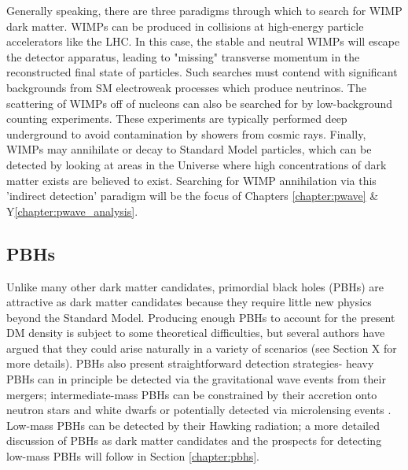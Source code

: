 Generally speaking, there are three paradigms through which to search for WIMP dark matter.
WIMPs can be produced in collisions at high-energy particle accelerators like the LHC.
In this case, the stable and neutral WIMPs will escape the detector apparatus, leading to "missing" transverse momentum in the reconstructed final state of particles.
Such searches must contend with significant backgrounds from SM electroweak processes which produce neutrinos.
The scattering of WIMPs off of nucleons can also be searched for by low-background counting experiments.
These experiments are typically performed deep underground to avoid contamination by showers from cosmic rays.
Finally, WIMPs may annihilate or decay to Standard Model particles, which can be detected by looking at areas in the Universe where high concentrations of dark matter exists are believed to exist.
Searching for WIMP annihilation via this 'indirect detection' paradigm will be the focus of Chapters \ref{chapter:pwave} \& Y\ref{chapter:pwave_analysis}. 

\subsection{PBHs}
Unlike many other dark matter candidates, primordial black holes (PBHs) are attractive as dark matter candidates because they require little new physics beyond the Standard Model.
Producing enough PBHs to account for the present DM density is subject to some theoretical difficulties, but several authors have argued that they could arise naturally in a variety of scenarios (see Section X for more details).
PBHs also present straightforward detection strategies- heavy PBHs can in principle be detected via the gravitational wave events from their mergers; intermediate-mass PBHs can be constrained by their accretion onto neutron stars and white dwarfs \cite{pani_tidal_2014} or potentially detected via microlensing events \cite{carr_primordial_2016}. Low-mass PBHs can be detected by their Hawking radiation; a more detailed discussion of PBHs as dark matter candidates and the prospects for detecting low-mass PBHs will follow in Section \ref{chapter:pbhs}. 

